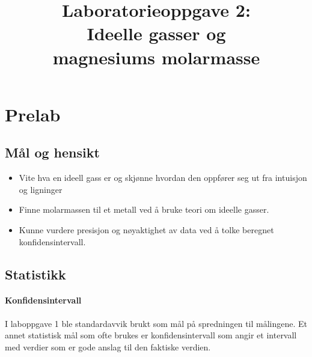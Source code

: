 


\title{Laboratorieoppgave 2:\\
	Ideelle gasser og \\
	magnesiums molarmasse}
\author{}
\date{}


			
	\maketitle
	
	\section{Prelab}
	
	\subsection{Mål og hensikt}
	\begin{itemize}
		\item Vite hva en ideell gass er og skjønne hvordan den oppfører seg ut fra intuisjon og ligninger
		
		\item Finne molarmassen til et metall ved å bruke teori om ideelle gasser.
		
		\item Kunne vurdere presisjon og nøyaktighet av data ved å tolke beregnet konfidensintervall.
	\end{itemize}
	
	\subsection{Statistikk}
	\paragraph{Konfidensintervall}
	I laboppgave 1 ble standardavvik brukt som mål på spredningen til målingene. Et annet statistisk mål som ofte brukes er konfidensintervall som angir et intervall med verdier som er gode anslag til den faktiske verdien. 
	
	\begin{comment}
		I laboppgave 1 ble resulatet oppgitt med $\text{gjennomsnittet} \pm \text{standardavviket}$, altså $\bar{x}\pm s$. I eksempelet ble det \SI[separate-uncertainty=true]{2.94 +- 0.12}{g}. Dette er en type konfidensintervall med \SI{68}{\percent} konfidens\todo{Kommentar om hvordan konfidensintervall skrives?}. Det vil si at hvis man hadde gjentatt forsøket mange ganger og regnet ut konfidensintervallene, ville \SI{68}{\percent} av intervallene inneholdt den faktiske verdien. 
	\end{comment}
	

